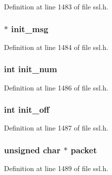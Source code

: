 Definition at line 1483 of file ssl.\+h.

\subsubsection[{\texorpdfstring{init\+\_\+msg}{init_msg}}]{ $\ast$ init\+\_\+msg}\hypertarget{structssl__st_a4c407e47f2646ceca014e1482cd964d1}{}\label{structssl__st_a4c407e47f2646ceca014e1482cd964d1}


Definition at line 1484 of file ssl.\+h.

\subsubsection[{\texorpdfstring{init\+\_\+num}{init_num}}]{\setlength{\rightskip}{0pt plus 5cm}int init\+\_\+num}\hypertarget{structssl__st_a0e106af183ccf2f5b0415a8aef1ac20a}{}\label{structssl__st_a0e106af183ccf2f5b0415a8aef1ac20a}


Definition at line 1486 of file ssl.\+h.

\subsubsection[{\texorpdfstring{init\+\_\+off}{init_off}}]{\setlength{\rightskip}{0pt plus 5cm}int init\+\_\+off}\hypertarget{structssl__st_ab2392e4fb72f424af6b092ec01bf412a}{}\label{structssl__st_ab2392e4fb72f424af6b092ec01bf412a}


Definition at line 1487 of file ssl.\+h.

\subsubsection[{\texorpdfstring{packet}{packet}}]{\setlength{\rightskip}{0pt plus 5cm}unsigned char $\ast$ packet}\hypertarget{structssl__st_a724f5bddffc45b222ae90da09d6c8628}{}\label{structssl__st_a724f5bddffc45b222ae90da09d6c8628}


Definition at line 1489 of file ssl.\+h.

